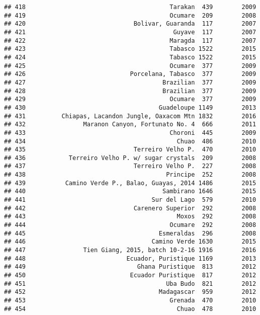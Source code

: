 \documentclass[
]{article}
\begin{document}
\begin{verbatim}
## 418                                        Tarakan  439        2009
## 419                                        Ocumare  209        2008
## 420                              Bolivar, Guaranda  117        2007
## 421                                         Guyave  117        2007
## 422                                        Maragda  117        2007
## 423                                        Tabasco 1522        2015
## 424                                        Tabasco 1522        2015
## 425                                        Ocumare  377        2009
## 426                             Porcelana, Tabasco  377        2009
## 427                                      Brazilian  377        2009
## 428                                      Brazilian  377        2009
## 429                                        Ocumare  377        2009
## 430                                     Guadeloupe 1149        2013
## 431          Chiapas, Lacandon Jungle, Oaxacom Mtn 1832        2016
## 432                Maranon Canyon, Fortunato No. 4  666        2011
## 433                                        Choroni  445        2009
## 434                                          Chuao  486        2010
## 435                              Terreiro Velho P.  470        2010
## 436            Terreiro Velho P. w/ sugar crystals  209        2008
## 437                              Terreiro Velho P.  227        2008
## 438                                       Principe  252        2008
## 439           Camino Verde P., Balao, Guayas, 2014 1486        2015
## 440                                      Sambirano 1646        2015
## 441                                   Sur del Lago  579        2010
## 442                              Carenero Superior  292        2008
## 443                                          Moxos  292        2008
## 444                                        Ocumare  292        2008
## 445                                     Esmeraldas  296        2008
## 446                                   Camino Verde 1630        2015
## 447                Tien Giang, 2015, batch 10-2-16 1916        2016
## 448                            Ecuador, Puristique 1169        2013
## 449                               Ghana Puristique  813        2012
## 450                             Ecuador Puristique  817        2012
## 451                                       Uba Budo  821        2012
## 452                                     Madagascar  959        2012
## 453                                        Grenada  470        2010
## 454                                          Chuao  478        2010

\end{verbatim}
\end{document}
